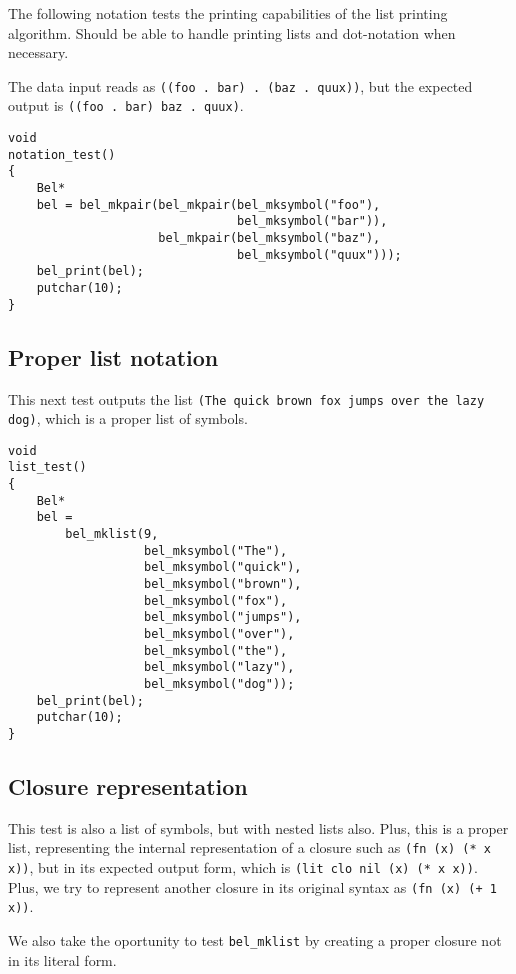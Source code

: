 \documentclass[openright,a4paper,twoside,12pt]{memoir}
\begin{document}
The following notation tests the printing capabilities of the list
printing algorithm. Should be able to handle printing lists and
dot-notation when necessary.

The data input reads as \texttt{((foo . bar) . (baz . quux))}, but the expected
output is \texttt{((foo . bar) baz . quux)}.

\begin{verbatim}
void
notation_test()
{
    Bel*
    bel = bel_mkpair(bel_mkpair(bel_mksymbol("foo"),
                                bel_mksymbol("bar")),
                     bel_mkpair(bel_mksymbol("baz"),
                                bel_mksymbol("quux")));
    bel_print(bel);
    putchar(10);
}
\end{verbatim}

\subsection{Proper list notation}
\label{sec:orge842c7d}

This next test outputs the list \texttt{(The quick brown fox jumps over the
lazy dog)}, which is a proper list of symbols.

\begin{verbatim}
void
list_test()
{
    Bel*
    bel =
        bel_mklist(9,
                   bel_mksymbol("The"),
                   bel_mksymbol("quick"),
                   bel_mksymbol("brown"),
                   bel_mksymbol("fox"),
                   bel_mksymbol("jumps"),
                   bel_mksymbol("over"),
                   bel_mksymbol("the"),
                   bel_mksymbol("lazy"),
                   bel_mksymbol("dog"));
    bel_print(bel);
    putchar(10);
}
\end{verbatim}

\subsection{Closure representation}
\label{sec:orgd96c09e}

This test is also a list of symbols, but with nested lists also. Plus,
this is a proper list, representing the internal representation of a
closure such as \texttt{(fn (x) (* x x))}, but in its expected output form,
which is \texttt{(lit clo nil (x) (* x x))}. Plus, we try to represent another
closure in its original syntax as \texttt{(fn (x) (+ 1 x))}.

We also take the oportunity to test \texttt{bel\_mklist} by creating a proper
closure not in its literal form.
\end{document}
